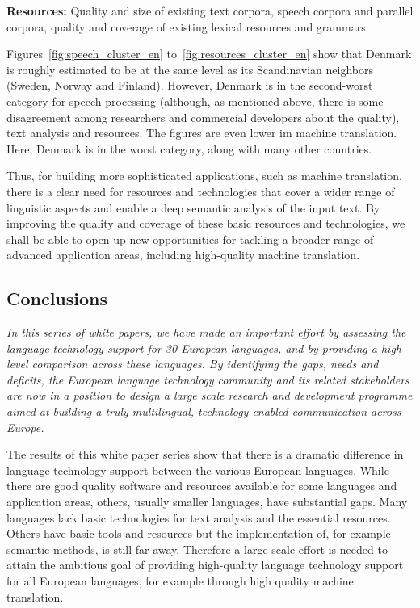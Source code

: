 \begin{multicols}{2}
\textbf{Resources:} Quality and size of existing text corpora, speech corpora and parallel corpora, quality and coverage of existing lexical resources and grammars.

Figures~\ref{fig:speech_cluster_en} to~\ref{fig:resources_cluster_en} show that Denmark is roughly estimated to be at the same level as its Scandinavian neighbors (Sweden, Norway and Finland). However,  Denmark is in the second-worst category for speech processing (although, as mentioned above, there is some disagreement among researchers and commercial developers about the quality), text analysis and resources.
 The figures are even lower im machine translation. Here, Denmark is in the worst category, along with many other countries.

 Thus, for building more sophisticated applications, such as machine translation, there is a clear need for resources and technologies that cover a wider range of linguistic aspects and enable a deep semantic analysis of the input text. By improving the quality and coverage of these basic resources and technologies, we shall be able to open up new opportunities for tackling a broader range of advanced application areas, including high-quality machine translation.

\subsection{Conclusions}

\emph{In this series of white papers, we have made an important effort by assessing the language technology support for 30 European languages, and by providing a high-level comparison across these languages. By identifying the gaps, needs and deficits, the European language technology community and its related stakeholders are now in a position to design a large scale research and development programme aimed at building a truly multilingual, technology-enabled communication across Europe.}

The results of this white paper series show that there is a dramatic difference in language technology support between the various European languages. While there are good quality software and resources available for some languages and application areas, others, usually smaller languages, have substantial gaps. Many languages lack basic technologies for text analysis and the essential resources. Others have basic tools and resources but the implementation of, for example semantic methods, is still far away. Therefore a large-scale effort is needed to attain the ambitious goal of providing high-quality language technology support for all European languages, for example through high quality machine translation. 


\end{multicols}
